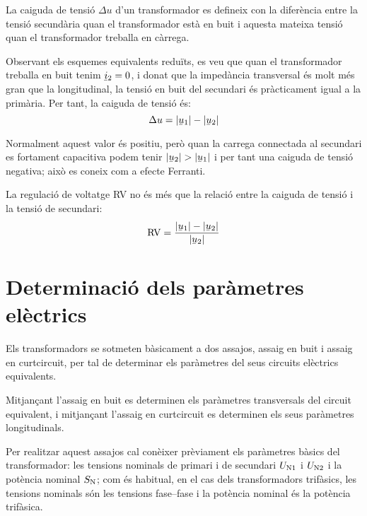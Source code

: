 La caiguda de tensió $\Delta u$ d'un transformador  es defineix con la diferència entre la tensió secundària quan el transformador està en buit i aquesta mateixa tensió quan el transformador treballa en càrrega.

Observant els esquemes equivalents reduïts, es veu que quan el transformador treballa en buit tenim $\cmplx{i}_2=0$, i donat que la impedància transversal és molt més gran que la longitudinal, la tensió en buit del secundari és pràcticament igual a la primària. Per tant, la caiguda de tensió és:
\begin{equation}
    \Delta u = |\cmplx{u}_1| - |\cmplx{u}_2|
\end{equation}

Normalment aquest valor és positiu, però quan la carrega connectada al secundari es fortament capacitiva podem tenir  $|\cmplx{u}_2| > |\cmplx{u}_1|$ i per tant una caiguda de tensió negativa; això es coneix com a efecte Ferranti.

La regulació de voltatge RV no és més que la relació entre la caiguda de tensió i la tensió de secundari:
\begin{equation}
    \text{RV} = \frac{|\cmplx{u}_1| - |\cmplx{u}_2|}{|\cmplx{u}_2|}
\end{equation}

\section{Determinació dels paràmetres elèctrics}\label{sec:determ-param-trafo}

Els transformadors se sotmeten bàsicament a dos assajos, assaig en
buit i assaig en curtcircuit, per tal de determinar els paràmetres
del seus circuits elèctrics equivalents.

Mitjançant l'assaig en buit es determinen els paràmetres
transversals del circuit equivalent, i mitjançant l'assaig en curtcircuit es determinen els seus paràmetres longitudinals.

Per realitzar aquest assajos cal conèixer prèviament els paràmetres
bàsics del transformador: les tensions nominals de primari i de
secundari $U_\mathrm{N1}$ i $U_\mathrm{N2}$ i la potència nominal
$S_\mathrm{N}$; com és habitual, en el cas dels transformadors
trifàsics, les tensions nominals són les tensions fase--fase i la
potència nominal és la potència trifàsica.


